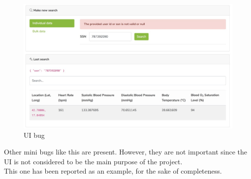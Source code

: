 \begin{itemize}
\begin{figure}[H]
\includegraphics[width=\linewidth]{images/bug1.png}
\caption{ UI bug }
\label{fig:bug1}
\end{figure}

Other mini bugs like this are present. However, they are not important since the 
UI is not considered to be the main purpose of the project. \\
This one has been reported as an example, for the sake of completeness.
\end{itemize}